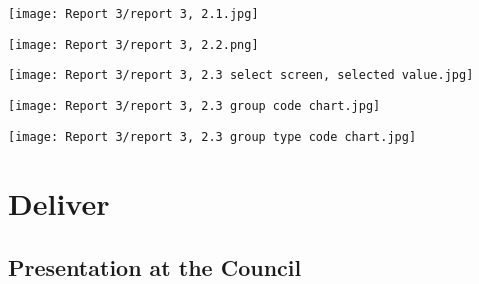 \begin{center}
  \texttt{[image: Report 3/report 3, 2.1.jpg]}
  \label{normal_case}
\end{center}

\begin{center}
  \texttt{[image: Report 3/report 3, 2.2.png]}
  \label{normal_case}
\end{center}

\begin{center}
  \texttt{[image: Report 3/report 3, 2.3 select screen, selected value.jpg]}
  \label{normal_case}
\end{center}


\begin{center}
  \texttt{[image: Report 3/report 3, 2.3 group code chart.jpg]}
  \label{normal_case}
\end{center}


\begin{center}
  \texttt{[image: Report 3/report 3, 2.3 group type code chart.jpg]}
  \label{normal_case}
\end{center}


	\section{Deliver}
	
		\subsection{Presentation at the Council}
		
